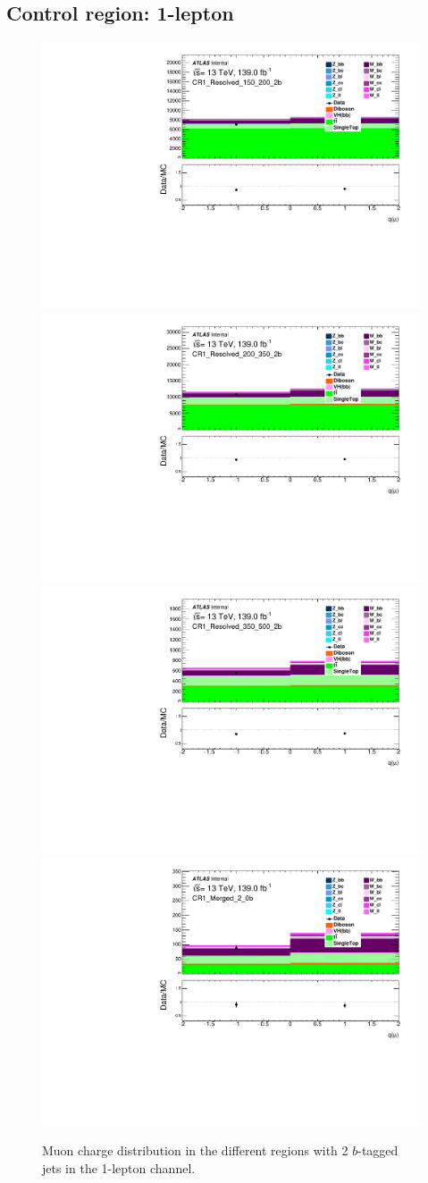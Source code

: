 \subsection{Control region: 1-lepton}

\begin{figure}[!htb]
    \includegraphics[width=0.46\linewidth]{chapters/c8/figures/1L/DataMC_MonoH_Nominal_CR1_Resolved_150_200_2b_mu_charge.pdf}
    \includegraphics[width=0.46\linewidth]{chapters/c8/figures/1L/DataMC_MonoH_Nominal_CR1_Resolved_200_350_2b_mu_charge.pdf}\\
    \includegraphics[width=0.46\linewidth]{chapters/c8/figures/1L/DataMC_MonoH_Nominal_CR1_Resolved_350_500_2b_mu_charge.pdf}
    \includegraphics[width=0.46\linewidth]{chapters/c8/figures/1L/DataMC_MonoH_Nominal_CR1_Merged_2_0b_mu_charge.pdf}
    \caption{Muon charge distribution in the different \met regions with 2 $b$-tagged jets in the 1-lepton channel.}
    \label{fig:data-mc-1l-mu-charge-2b}
\end{figure}

